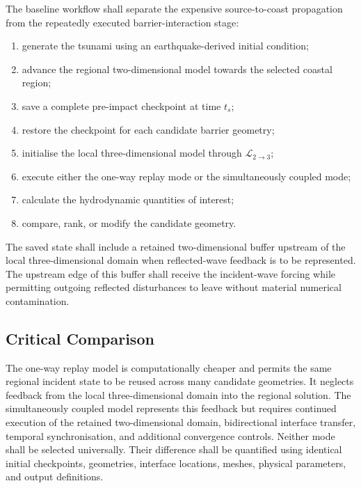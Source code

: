 The baseline workflow shall separate the expensive source-to-coast propagation from the repeatedly executed barrier-interaction stage:
\begin{enumerate}
  \item generate the tsunami using an earthquake-derived initial condition;
  \item advance the regional two-dimensional model towards the selected coastal region;
  \item save a complete pre-impact checkpoint at time $t_s$;
  \item restore the checkpoint for each candidate barrier geometry;
  \item initialise the local three-dimensional model through $\mathcal{L}_{2\rightarrow3}$;
  \item execute either the one-way replay mode or the simultaneously coupled mode;
  \item calculate the hydrodynamic quantities of interest;
  \item compare, rank, or modify the candidate geometry.
\end{enumerate}
The saved state shall include a retained two-dimensional buffer upstream of the local three-dimensional domain when reflected-wave feedback is to be represented. The upstream edge of this buffer shall receive the incident-wave forcing while permitting outgoing reflected disturbances to leave without material numerical contamination.

\subsection{Critical Comparison}
\label{sec:res-mod-mul-critical-comparison}


The one-way replay model is computationally cheaper and permits the same regional incident state to be reused across many candidate geometries. It neglects feedback from the local three-dimensional domain into the regional solution. The simultaneously coupled model represents this feedback but requires continued execution of the retained two-dimensional domain, bidirectional interface transfer, temporal synchronisation, and additional convergence controls. Neither mode shall be selected universally. Their difference shall be quantified using identical initial checkpoints, geometries, interface locations, meshes, physical parameters, and output definitions.

